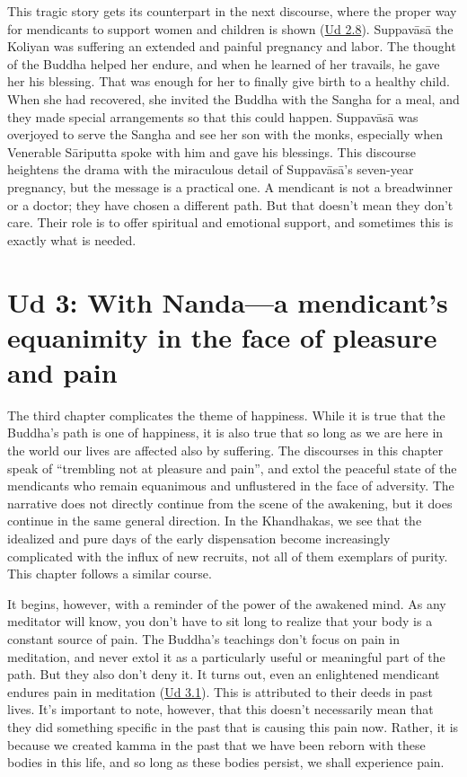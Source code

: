 \documentclass[12pt,openany]{book}%
\begin{document}
This tragic story gets its counterpart in the next discourse, where the proper way for mendicants to support women and children is shown (\href{https://suttacentral.net/ud2.8/en/sujato}{Ud 2.8}). \textsanskrit{Suppavāsā} the Koliyan was suffering an extended and painful pregnancy and labor. The thought of the Buddha helped her endure, and when he learned of her travails, he gave her his blessing. That was enough for her to finally give birth to a healthy child. When she had recovered, she invited the Buddha with the Sangha for a meal, and they made special arrangements so that this could happen. \textsanskrit{Suppavāsā} was overjoyed to serve the Sangha and see her son with the monks, especially when Venerable \textsanskrit{Sāriputta} spoke with him and gave his blessings. This discourse heightens the drama with the miraculous detail of \textsanskrit{Suppavāsā}’s seven-year pregnancy, but the message is a practical one. A mendicant is not a breadwinner or a doctor; they have chosen a different path. But that doesn’t mean they don’t care. Their role is to offer spiritual and emotional support, and sometimes this is exactly what is needed.

\section*{Ud 3: With Nanda—a mendicant’s equanimity in the face of pleasure and pain}

The third chapter complicates the theme of happiness. While it is true that the Buddha’s path is one of happiness, it is also true that so long as we are here in the world our lives are affected also by suffering. The discourses in this chapter speak of “trembling not at pleasure and pain”, and extol the peaceful state of the mendicants who remain equanimous and unflustered in the face of adversity. The narrative does not directly continue from the scene of the awakening, but it does continue in the same general direction. In the Khandhakas, we see that the idealized and pure days of the early dispensation become increasingly complicated with the influx of new recruits, not all of them exemplars of purity. This chapter follows a similar course.

It begins, however, with a reminder of the power of the awakened mind. As any meditator will know, you don’t have to sit long to realize that your body is a constant source of pain. The Buddha’s teachings don’t focus on pain in meditation, and never extol it as a particularly useful or meaningful part of the path. But they also don’t deny it. It turns out, even an enlightened mendicant endures pain in meditation (\href{https://suttacentral.net/ud3.1/en/sujato}{Ud 3.1}). This is attributed to their deeds in past lives. It’s important to note, however, that this doesn’t necessarily mean that they did something specific in the past that is causing this pain now. Rather, it is because we created kamma in the past that we have been reborn with these bodies in this life, and so long as these bodies persist, we shall experience pain.
\end{document}
